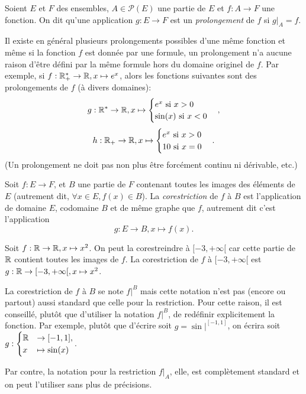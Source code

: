 \begin{definition}[Prolongement]
Soient $E$ et $F$ des ensembles, $A\in \mathcal P(E)$ une partie de $E$ et $f : A\to F$ une fonction. On dit qu'une application $g : E\to F$ est un \emph{prolongement} de $f$ si $g|_A = f$.
\end{definition}

\begin{attention}
Il existe en général plusieurs prolongements possibles d'une même fonction et même si la fonction $f$ est donnée par une formule, un prolongement n'a aucune raison d'être défini par la même formule hors du domaine originel de $f$. Par exemple, si $f : \mathbb{R}_+^* \to \mathbb{R}, x\mapsto e^x$, alors les fonctions suivantes  sont des prolongements de $f$ (à divers domaines):
\[g : \mathbb{R}^* \to \mathbb{R}, x\mapsto \begin{cases}e^x\text{ si } x>0\\ \sin(x) \text{ si } x<0\end{cases},\]
\[h : \mathbb{R}_+ \to \mathbb{R}, x\mapsto \begin{cases}e^x\text{ si } x>0\\ 10 \text{ si }x=0\end{cases}.\]
(Un prolongement ne doit pas non plus être forcément continu ni dérivable, etc.)
\end{attention}


\begin{definition}[Corestriction]
\label{def-corestriction}
Soit $f : E\to F$, et $B$ une partie de $F$ contenant toutes les images des éléments de $E$ (autrement dit, $\forall x\in E, f(x)\in B$).
La \emph{corestriction} de $f$ à $B$ est l'application de domaine $E$, codomaine $B$ et de même graphe que $f$, autrement dit c'est l'application 
\[ g : E\to B, x\mapsto f(x).\]
\end{definition}




\begin{exemple}
Soit $f : \mathbb{R}\to \mathbb{R}, x\mapsto x^2$. On peut la corestreindre à $[-3,+\infty[$ car cette partie de $\mathbb{R}$ contient toutes les images de $f$. La corestriction de $f$ à $[-3,+\infty[$ est $g : \mathbb{R}\to [-3,+\infty[, x\mapsto x^2$.
\end{exemple}


\begin{attention}
La corestriction de $f$ à $B$ se note $f|^{B}$ mais cette notation n'est pas (encore ou partout) aussi standard que celle pour la restriction. Pour cette raison, il est conseillé, plutôt que d'utiliser la notation $f|^{B}$, de redéfinir explicitement la fonction. Par exemple, plutôt que d'écrire \og soit $g=\sin|^{[-1,1]}$\fg, on écrira \og soit $g : \begin{cases} \mathbb{R}&\to [-1,1],\\ x&\mapsto \sin(x)\end{cases}$.\fg{}

Par contre, la notation pour la restriction $f|_A$, elle, est complètement standard et on peut l'utiliser sans plus de précisions.
\end{attention}


